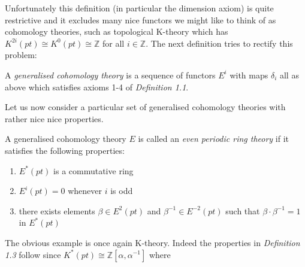 Unfortunately this definition
(in particular the dimension axiom)
is quite restrictive and it excludes many
nice functors we might like to think of
as cohomology theories, such as
topological K-theory which
has $K^{2i}(pt)\cong K^{0}(pt)\cong \mathbb{Z}$ for all
$i\in \mathbb{Z}$. The next definition
tries to rectify this problem:

\begin{defn}
  A \textit{generalised cohomology theory} is
  a sequence of functors $E^i$ with maps
  $\delta_i$ all as above which satisfies
  axioms 1-4 of \textit{Definition 1.1}.
\end{defn}

Let us now consider a particular set of
generalised cohomology theories with
rather nice nice properties.

\begin{defn}
  A generalised cohomology theory $E$
  is called an \textit{even periodic ring
    theory} if it
  satisfies the following properties:
  \begin{enumerate}
  \item $E^*(pt)$ is a commutative ring
  \item $E^i(pt) = 0$ whenever $i$ is odd
  \item there exists elements
    $\beta\in E^{2}(pt)$ and $\beta^{-1}
    \in E^{-2}(pt)$ such that $\beta\cdot \beta^{-1}
    =1$ in $E^*(pt)$
  \end{enumerate}
\end{defn}

The obvious example is once again K-theory.
Indeed the properties in
\textit{Definition 1.3} follow since
$K^*(pt)\cong\mathbb{Z}
[\alpha,\alpha^{-1}]$
where 